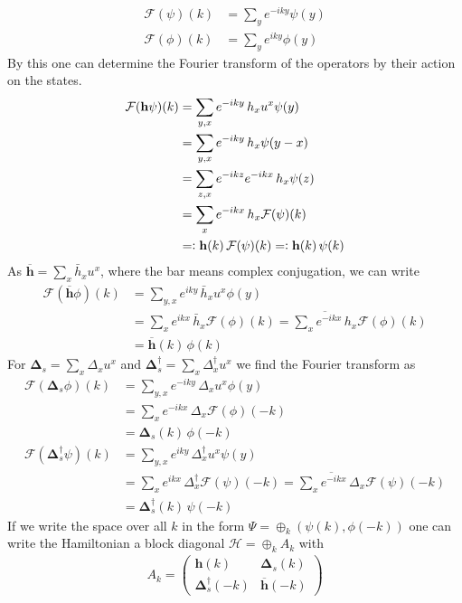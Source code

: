 \begin{align*}
    \mathcal{F}(\psi)(k)&=\sum_y e^{-iky}\psi(y)\\
    \mathcal{F}(\phi)(k)&=\sum_y e^{iky}\phi(y)
\end{align*}
By this one can determine the Fourier transform of the operators by their action on the states.
\begin{align*}
    \mathcal{F}(\mathbf{h}\psi)(k)&=\sum_{y,x}e^{-iky}\,h_x u^x \psi(y)\\
    &=\sum_{y,x}e^{-iky}\,h_x \psi(y-x)\\
    &=\sum_{z,x}e^{-ikz}e^{-ikx}\,h_x \psi(z)\\
    &=\sum_{x}e^{-ikx}\,h_x \mathcal{F}(\psi)(k)\\
    &=\vcentcolon \mathbf{h}(k)\,\mathcal{F}(\psi)(k)=\vcentcolon \mathbf{h}(k)\,\psi(k)
\end{align*}
As $\overline{\mathbf{h}}=\sum_x\bar{h}_x u^x$, where the bar means complex conjugation, we can write
\begin{align*}
    \mathcal{F}(\overline{\mathbf{h}}\phi)(k)&=\sum_{y,x}e^{iky}\,\bar{h}_x u^x \phi(y)\\
    &=\sum_{x}e^{ikx}\,\bar{h}_x \mathcal{F}(\phi)(k)=\overline{\sum_{x}e^{-ikx}\,h_x} \mathcal{F}(\phi)(k)\\
    &= \overline{\mathbf{h}}(k)\,\phi(k)
\end{align*}
For $\mathbf{\Delta}_s=\sum_x\Delta_x u^x$ and $\mathbf{\Delta}_s^\dagger=\sum_x\Delta_x^\dagger u^x$ we find the Fourier transform as
\begin{align*}
     \mathcal{F}(\mathbf{\Delta}_s\phi)(k)&=\sum_{y,x}e^{-iky}\,\Delta_x u^x \phi(y)\\
    &=\sum_{x}e^{-ikx}\,\Delta_x \mathcal{F}(\phi)(-k)\\
    &= \mathbf{\Delta}_s(k)\,\phi(-k)\\
    \mathcal{F}(\mathbf{\Delta}_s^\dagger\psi)(k)&=\sum_{y,x}e^{iky}\,\Delta_x^\dagger u^x \psi(y)\\
    &=\sum_{x}e^{ikx}\,\Delta_x^\dagger \mathcal{F}(\psi)(-k)=\overline{\sum_{x}e^{-ikx}\,\Delta_x} \mathcal{F}(\psi)(-k)\\
    &= \mathbf{\Delta}_s^\dagger(k)\,\psi(-k)
\end{align*}
If we write the space over all $k$ in the form $\Psi=\oplus_k (\psi(k),\phi(-k))$ one can write the Hamiltonian a block diagonal $\mathcal{H}=\oplus_k A_k$ with
\begin{align*}
    A_k = \begin{pmatrix}
        \mathbf{h}(k) & \mathbf{\Delta}_s(k)\\
        \mathbf{\Delta}_s^\dagger(-k) & \overline{\mathbf{h}}(-k)
    \end{pmatrix}
\end{align*}
